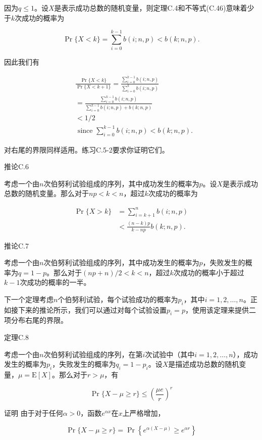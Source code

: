 \documentclass[lang=cn,newtx,10pt,scheme=chinese]{elegantbook}
\begin{document}
因为$q \leq 1$。设$X$是表示成功总数的随机变量，则定理C.4和不等式(C.46)意味着少于$k$次成功的概率为

$$
\operatorname{Pr}\{X<k\}=\sum_{i=0}^{k-1} b(i ; n, p)<b(k ; n, p) .
$$

因此我们有

$$
\begin{aligned}
& \frac{\operatorname{Pr}\{X<k\}}{\operatorname{Pr}\{X<k+1\}}=\frac{\sum_{i=0}^{k-1} b(i ; n, p)}{\sum_{i=0}^k b(i ; n, p)} \\
&=\frac{\sum_{i=0}^{k-1} b(i ; n, p)}{\sum_{i=0}^{k-1} b(i ; n, p)+b(k ; n, p)} \\
&<1 / 2 \\
& \text { since } \sum_{i=0}^{k-1} b(i ; n, p)<b(k ; n, p) .
\end{aligned}
$$

对右尾的界限同样适用。练习C.5-2要求你证明它们。

推论C.6

考虑一个由$n$次伯努利试验组成的序列，其中成功发生的概率为$p$。设$X$是表示成功总数的随机变量。那么对于$n p<k<n$，超过$k$次成功的概率为

$$
\begin{aligned}
\operatorname{Pr}\{X>k\} & =\sum_{i=k+1}^n b(i ; n, p) \\
& <\frac{(n-k) p}{k-n p} b(k ; n, p) .
\end{aligned}
$$

推论C.7

考虑一个由$n$次伯努利试验组成的序列，其中成功发生的概率为$p$，失败发生的概率为$q=1-p$。那么对于$(n p+n) / 2<k<n$，超过$k$次成功的概率小于超过$k-1$次成功的概率的一半。

下一个定理考虑$n$个伯努利试验，每个试验成功的概率为$p_i$，其中$i=1,2, \ldots, n$。正如接下来的推论所示，我们可以通过对每个试验设置$p_i=p$，使用该定理来提供二项分布右尾的界限。

定理C.8

考虑一个由$n$次伯努利试验组成的序列，在第$i$次试验中（其中$i=1,2, \ldots, n$），成功发生的概率为$p_i$，失败发生的概率为$q_i=1-p_i$。设$X$是描述成功总数的随机变量，$\mu=\mathrm{E}[X]$。那么对于$r>\mu$，有

$$
\operatorname{Pr}\{X-\mu \geq r\} \leq\left(\frac{\mu e}{r}\right)^r
$$

证明 由于对于任何$\alpha>0$，函数$e^{\alpha x}$在$x$上严格增加，

$$
\operatorname{Pr}\{X-\mu \geq r\}=\operatorname{Pr}\left\{e^{\alpha(X-\mu)} \geq e^{\alpha r}\right\}
$$
\end{document}
